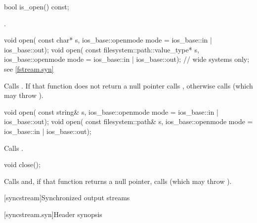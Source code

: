 %
\begin{itemdecl}
bool is_open() const;
\end{itemdecl}

\begin{itemdescr}
\pnum
\returns
{}.
\end{itemdescr}

%
\begin{itemdecl}
void open(
  const char* s,
  ios_base::openmode mode = ios_base::in | ios_base::out);
void open(
  const filesystem::path::value_type* s,
  ios_base::openmode mode = ios_base::in | ios_base::out);  // wide systems only; see \ref{fstream.syn}
\end{itemdecl}

\begin{itemdescr}
\pnum
\effects
Calls
.
If that function does not return a null pointer calls ,
otherwise calls
(which may throw
).
\end{itemdescr}

%
\begin{itemdecl}
void open(
  const string& s,
  ios_base::openmode mode = ios_base::in | ios_base::out);
void open(
  const filesystem::path& s,
  ios_base::openmode mode = ios_base::in | ios_base::out);
\end{itemdecl}

\begin{itemdescr}
\pnum
\effects Calls .
\end{itemdescr}

%
\begin{itemdecl}
void close();
\end{itemdecl}

\begin{itemdescr}
\pnum
\effects
Calls
and, if that function
returns a null pointer,
calls
(which may throw
).
\end{itemdescr}

[syncstream]{Synchronized output streams}

[syncstream.syn]{Header  synopsis}
%

